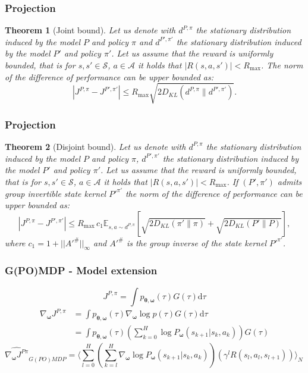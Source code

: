 \documentclass[english,aspectratio=1610]{beamer}
\theoremstyle{mystyle}
\theoremstyle{mystyle}
\newtheorem{thr}{Theorem}
\theoremstyle{mystyle}
\begin{document}
\begin{frame}
\frametitle{Projection}

	\begin{thr}[Joint bound]
Let us denote with $d^{P,\pi}$ the stationary distribution induced by the model $P$ and policy $\pi$ and $d^{P',\pi'}$ the stationary distribution induced by the model $P'$ and policy $\pi'$. Let us assume that the reward is uniformly bounded, that is for $s, s' \in \mathcal{S}$, $a \in \mathcal{A}$ it holds that $|R(s,a,s')| < R_{\max}$. The norm of the difference of performance can be upper bounded as:
\begin{equation}
	|J^{P,\pi} - J^{P',\pi'}| \leq R_{\max} \sqrt{2 D_{KL} (d^{P,\pi} \| d^{P',\pi'})}.
\end{equation}
\end{thr}
\end{frame}

\begin{frame}
\frametitle{Projection}
\begin{thr}[Disjoint bound]
Let us denote with $d^{P,\pi}$ the stationary distribution induced by the model $P$ and policy $\pi$, $d^{P',\pi'}$ the stationary distribution induced by the model $P'$ and policy $\pi'$. Let us assume that the reward is uniformly bounded, that is for $s, s' \in \mathcal{S}$, $a \in \mathcal{A}$ it holds that $|R(s,a,s')| < R_{\max}$. If $(P',\pi')$ admits group invertible state kernel $P'^{\pi'}$ the norm of the difference of performance can be upper bounded as:
\begin{equation}
	|J^{P,\pi} - J^{P',\pi'}| \le R_{\max} \, c_1 \mathbb{E}_{s,a \sim d^{P,\pi}} \left[ \sqrt{2D_{KL}(\pi'\|\pi)} + \sqrt{2D_{KL}(P'\|P)} \right],
\end{equation}
where $c_1 = 1 + ||A'^{\#}||_{\infty}$ and $A'^{\#}$ is the group inverse of the state kernel $P'^{\pi'}$.
\end{thr}
\end{frame}

\begin{frame}
\frametitle{G(PO)MDP - Model extension}
	$$
J^{P,\pi} = \int p_{\boldsymbol{\theta},\boldsymbol{\omega}}(\tau)G(\tau) \mathrm{d}\tau
$$
\begin{align}
	\nabla_{\boldsymbol{\omega}}J^{P,\pi} &= \int p_{\boldsymbol{\theta},\boldsymbol{\omega}}(\tau) \nabla_{\boldsymbol{\omega}}\log p(\tau) G(\tau) \mathrm{d}\tau \\
	&= \int p_{\boldsymbol{\theta},\boldsymbol{\omega}}(\tau) \left(\sum_{k=0}^{H} \log P_{\boldsymbol{\omega}}(s_{k+1} | s_k, a_k)  \right) G(\tau)
\end{align}
\begin{equation}
\widehat{\nabla_{\boldsymbol{\omega}} J^{P\pi}}_{G(PO)MDP} = \langle \sum_{l=0}^H \left( \sum_{k=l}^H \nabla_{\bm{\omega}} \log P_{\boldsymbol{\omega}}(s_{k+1} | s_k, a_k) \right) \left( \gamma^l R(s_l,a_l, s_{l+1}) \right) \rangle_N \,
\end{equation}

\end{frame}
\end{document}
